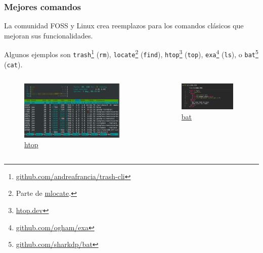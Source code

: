 \documentclass[aspectratio=43]{beamer}
\begin{document}
\begin{frame}
    \frametitle{Mejores comandos}
    La comunidad FOSS y Linux crea reemplazos para los comandos clásicos que mejoran sus funcionalidades.\newline

    Algunos ejemplos son \texttt{trash}\footnote{\href{https://github.com/andreafrancia/trash-cli}{github.com/andreafrancia/trash-cli}} (\texttt{rm}), \texttt{locate}\footnote{Parte de \href{https://pagure.io/mlocate}{mlocate}.} (\texttt{find}), \texttt{htop}\footnote{\href{https://htop.dev/}{htop.dev}} (\texttt{top}), \texttt{exa}\footnote{\href{https://github.com/ogham/exa}{github.com/ogham/exa}} (\texttt{ls}), o \texttt{bat}\footnote{\href{https://github.com/sharkdp/bat}{github.com/sharkdp/bat}} (\texttt{cat}).

    \begin{columns}[c]
        \begin{column}{0.4\textwidth}
            \begin{figure}
                \centering
                \includegraphics[width=0.9\textwidth]{img/htop.jpg}
                \caption{\href{https://htop.dev/}{htop}}
            \end{figure}
        \end{column}
        \begin{column}{0.4\textwidth}
            \begin{figure}
                \centering
                \includegraphics[width=0.9\textwidth]{img/bat.png}
                \caption{\href{https://github.com/sharkdp/bat}{bat}}
            \end{figure}
        \end{column}
    \end{columns}
\end{frame}
\end{document}
